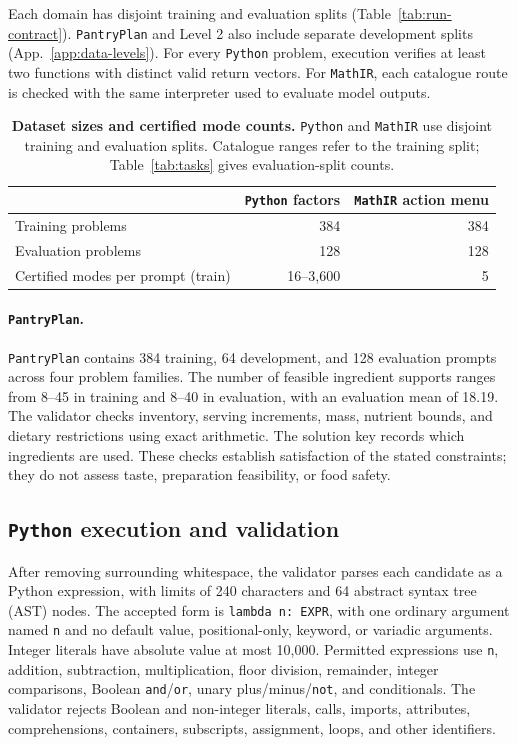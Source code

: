 Each domain has disjoint training and evaluation splits
(Table~\ref{tab:run-contract}). \texttt{PantryPlan} and Level 2 also include
separate development splits (App.~\ref{app:data-levels}). For every
\texttt{Python} problem, execution verifies at least two functions with
distinct valid return vectors. For \texttt{MathIR}, each catalogue route is
checked with the same interpreter used to evaluate model outputs.

\begin{table}[!htbp]
\centering
\caption{\textbf{Dataset sizes and certified mode counts.} \texttt{Python} and \texttt{MathIR}
use disjoint training and evaluation splits. Catalogue ranges refer to the
training split; Table~\ref{tab:tasks} gives evaluation-split counts.}

\label{tab:materialization-identities}
\small
\begin{tabular}{@{}lrr@{}}
\toprule
& \textbf{\texttt{Python} factors} & \textbf{\texttt{MathIR} action menu} \\
\midrule
Training problems & 384 & 384 \\
Evaluation problems & 128 & 128 \\
Certified modes per prompt (train) & 16--3{,}600 & 5 \\
\bottomrule
\end{tabular}
\end{table}

\paragraph{\texttt{PantryPlan}.}
\label{app:data-pantry}
\texttt{PantryPlan} contains 384 training, 64 development, and 128 evaluation
prompts across four problem families. The number of feasible ingredient
supports ranges from 8--45 in training and
8--40 in evaluation, with an evaluation mean of
18.19. The validator checks inventory, serving increments, mass,
nutrient bounds, and dietary restrictions using exact arithmetic. The solution
key records which ingredients are used. These checks establish satisfaction
of the stated constraints; they do not assess taste, preparation feasibility,
or food safety.

\subsection{\texttt{Python} execution and validation}
\label{app:python}
\label{app:python-language}

After removing surrounding whitespace, the validator parses each candidate
as a Python expression, with limits of 240 characters and 64 abstract syntax
tree (AST) nodes. The accepted form is \texttt{lambda n: EXPR}, with one
ordinary argument named \texttt{n} and no default value, positional-only,
keyword, or variadic arguments. Integer literals have absolute value at most
10,000. Permitted expressions use \texttt{n}, addition, subtraction,
multiplication, floor division, remainder, integer comparisons, Boolean
\texttt{and}/\texttt{or}, unary plus/minus/\texttt{not}, and conditionals.
The validator rejects Boolean and non-integer literals, calls, imports,
attributes, comprehensions, containers, subscripts, assignment, loops, and
other identifiers.

